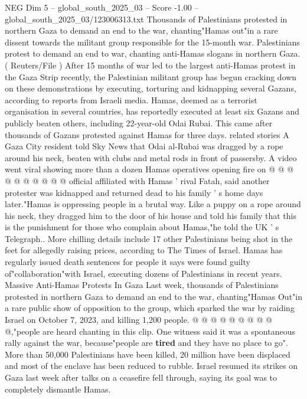 \begin{textsample}{NEG Dim 5 – global\_south\_2025\_03 – Score -1.00 – global\_south\_2025\_03/123006313.txt}  \label{ex:f5_neg_273}
Thousands of Palestinians protested in northern Gaza to demand an end to the war, chanting"Hamas out"in a rare dissent towards the militant group responsible for the 15-month war.
Palestinians protest to demand an end to war, chanting anti-Hamas slogans in northern Gaza. ( Reuters/File ) After 15 months of war led to the largest anti-Hamas protest in the Gaza Strip recently, the Palestinian militant group has begun cracking down on these demonstrations by executing, torturing and kidnapping several Gazans, according to reports from Israeli media.
Hamas, deemed as a terrorist organisation in several countries, has reportedly executed at least six Gazans and publicly beaten others, including 22-year-old Odai Rubai.
This came after thousands of Gazans protested against Hamas for three days. related stories A Gaza City resident told Sky News that Odai al-Rubai was dragged by a rope around his neck, beaten with clubs and metal rods in front of passersby.
A video went viral showing more than a dozen Hamas operatives opening fire on @ @ @ @ @ @ @ @ @ @ official affiliated with Hamas ' rival Fatah, said another protester was kidnapped and returned dead to his family ' s home days later."Hamas is oppressing people in a brutal way.
Like a puppy on a rope around his neck, they dragged him to the door of his house and told his family that this is the punishment for those who complain about Hamas,"he told the UK ' s Telegraph..
More chilling details include 17 other Palestinians being shot in the feet for allegedly raising prices, according to The Times of Israel.
Hamas has regularly issued death sentences for people it says were found guilty of"collaboration"with Israel, executing dozens of Palestinians in recent years.
Massive Anti-Hamas Protests In Gaza Last week, thousands of Palestinians protested in northern Gaza to demand an end to the war, chanting"Hamas Out"in a rare public show of opposition to the group, which sparked the war by raiding Israel on October 7, 2023, and killing 1,200 people. @ @ @ @ @ @ @ @ @ @,"people are heard chanting in this clip.
One witness said it was a spontaneous rally against the war, because"people are \textbf{tired} and they have no place to go".
More than 50,000 Palestinians have been killed, 20 million have been displaced and most of the enclave has been reduced to rubble.
Israel resumed its strikes on Gaza last week after talks on a ceasefire fell through, saying its goal was to completely dismantle Hamas.

\end{textsample}
